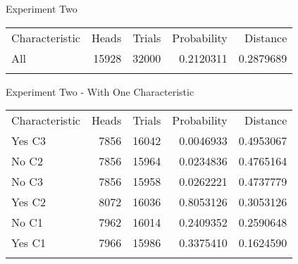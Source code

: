 \documentclass[
  ignorenonframetext,
]{beamer}
\renewcommand{\,}{\text{, }}
\begin{document}
\begin{frame}{Experiment Two}
\protect\hypertarget{experiment-two}{}
\begin{longtable}[]{@{}lrrrr@{}}
\toprule
Characteristic & Heads & Trials & Probability &
Distance \\ \addlinespace
\midrule
\endhead
All & 15928 & 32000 & 0.2120311 & 0.2879689 \\ \addlinespace
\bottomrule
\end{longtable}
\end{frame}

\begin{frame}{Experiment Two - With One Characteristic}
\protect\hypertarget{experiment-two---with-one-characteristic}{}
\begin{longtable}[]{@{}lrrrr@{}}
\toprule
Characteristic & Heads & Trials & Probability &
Distance \\ \addlinespace
\midrule
\endhead
Yes C3 & 7856 & 16042 & 0.0046933 & 0.4953067 \\ \addlinespace
No C2 & 7856 & 15964 & 0.0234836 & 0.4765164 \\ \addlinespace
No C3 & 7856 & 15958 & 0.0262221 & 0.4737779 \\ \addlinespace
Yes C2 & 8072 & 16036 & 0.8053126 & 0.3053126 \\ \addlinespace
No C1 & 7962 & 16014 & 0.2409352 & 0.2590648 \\ \addlinespace
Yes C1 & 7966 & 15986 & 0.3375410 & 0.1624590 \\ \addlinespace
\bottomrule
\end{longtable}
\end{frame}
\end{document}
